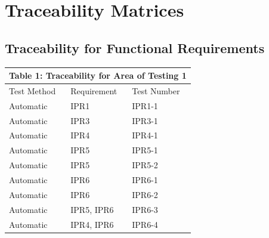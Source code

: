 \documentclass[12pt, titlepage]{article}
\begin{document}
\section{Traceability Matrices}
\subsection{Traceability for Functional Requirements}
\begin{tabular}{|p{}|p{}|p{}|}

\hline \multicolumn{3}{|c|}{Table 1: Traceability for Area of Testing 1}\\

\hline Test Method&Requirement&Test Number\\

\hline Automatic&IPR1&IPR1-1\\

\hline Automatic&IPR3&IPR3-1\\

\hline Automatic&IPR4&IPR4-1\\

\hline Automatic&IPR5&IPR5-1\\

\hline Automatic&IPR5&IPR5-2\\

\hline Automatic&IPR6&IPR6-1\\

\hline Automatic&IPR6&IPR6-2\\

\hline Automatic&IPR5, IPR6&IPR6-3\\

\hline Automatic&IPR4, IPR6&IPR6-4\\

\hline

\end{tabular}
\\
\end{document}

